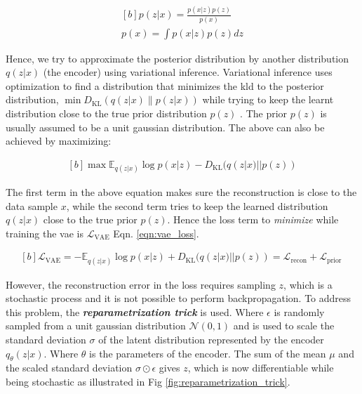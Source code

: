 \begin{equation}\label{eqn:pofx}
    \begin{gathered}[b]
        p(z | x)=\frac{p(x | z) p(z)}{p(x)} \\
        p(x)=\int p(x | z) p(z) dz
    \end{gathered}
\end{equation}

Hence, we try to approximate the posterior distribution by another distribution $q(z|x)$ (the encoder) using variational inference. Variational inference uses optimization to find a distribution that minimizes the \ac{kld} to the posterior distribution, $\min D_{\mathrm{KL}}(q(z| x) \| p(z| x))$ while trying to keep the learnt distribution close to the true prior distribution $p(z)$ \cite{variational_inference}. The prior $p(z)$ is usually assumed to be a unit gaussian distribution. The above can also be achieved by maximizing:

\begin{equation} \label{eqn:minKLd}
    \begin{gathered}[b]
        \max \mathbb{E}_{q(z | x)} \log p(x | z) - D_{\mathrm{KL}}(q(z | x) || p(z))
    \end{gathered}
\end{equation}

The first term in the above equation makes sure the reconstruction is close to the data sample $x$, while the second term tries to keep the learned distribution $q(z|x)$ close to the true prior $p(z)$. Hence the loss term to \textit{minimize} while training the \ac{vae} is $\mathcal{L}_{\mathrm{VAE}}$ Eqn. \ref{eqn:vae_loss}.

\begin{equation} \label{eqn:vae_loss}
    \begin{gathered}[b]
        \mathcal{L}_{\mathrm{VAE}}=-\mathbb{E}_{q(z | x)} \log p(x | z) + D_{\mathrm{KL}}(q(z | x) || p(z)) =\mathcal{L}_{\text {recon}} +\mathcal{L}_{\text {prior }}
    \end{gathered}
\end{equation}

However, the reconstruction error in the loss requires sampling $z$, which is a stochastic process and it is not possible to perform backpropagation. To address this problem, the \textbf{\textit{reparametrization trick}} is used. Where $\epsilon$ is randomly sampled from a unit gaussian distribution $\mathcal{N}(0,1)$ and is used to scale the standard deviation $\sigma$ of the latent distribution represented by the encoder $q_{\theta}(z|x)$. Where $\theta$ is the parameters of the encoder. The sum of the mean $\mu$ and the scaled standard deviation $\sigma \odot \epsilon$ gives $z$, which is now differentiable while being stochastic as illustrated in Fig \ref{fig:reparametrization_trick}.

